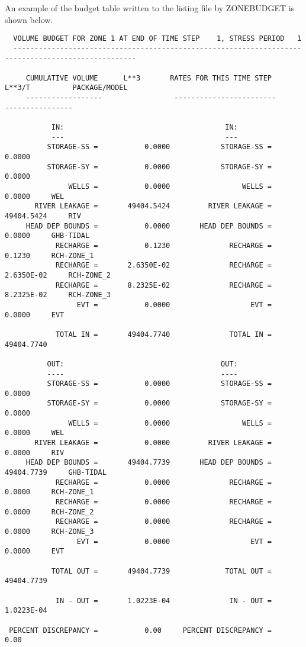 \documentclass[11pt,twoside,twocolumn]{usgsreport}
\begin{document}
An example of the budget table written to the listing file by ZONEBUDGET is shown below.

\begingroup
    \fontsize{8pt}{10pt}\selectfont
    \begin{verbatim}  
  VOLUME BUDGET FOR ZONE 1 AT END OF TIME STEP    1, STRESS PERIOD   1
  ---------------------------------------------------------------------------------------------------

     CUMULATIVE VOLUME      L**3       RATES FOR THIS TIME STEP      L**3/T          PACKAGE/MODEL   
     ------------------                 ------------------------                     ----------------

           IN:                                      IN:
           ---                                      ---
          STORAGE-SS =           0.0000            STORAGE-SS =           0.0000                     
          STORAGE-SY =           0.0000            STORAGE-SY =           0.0000                     
               WELLS =           0.0000                 WELLS =           0.0000     WEL             
       RIVER LEAKAGE =       49404.5424         RIVER LEAKAGE =       49404.5424     RIV             
     HEAD DEP BOUNDS =           0.0000       HEAD DEP BOUNDS =           0.0000     GHB-TIDAL       
            RECHARGE =           0.1230              RECHARGE =           0.1230     RCH-ZONE_1      
            RECHARGE =       2.6350E-02              RECHARGE =       2.6350E-02     RCH-ZONE_2      
            RECHARGE =       8.2325E-02              RECHARGE =       8.2325E-02     RCH-ZONE_3      
                 EVT =           0.0000                   EVT =           0.0000     EVT             

            TOTAL IN =       49404.7740              TOTAL IN =       49404.7740

          OUT:                                     OUT:
          ----                                     ----
          STORAGE-SS =           0.0000            STORAGE-SS =           0.0000                     
          STORAGE-SY =           0.0000            STORAGE-SY =           0.0000                     
               WELLS =           0.0000                 WELLS =           0.0000     WEL             
       RIVER LEAKAGE =           0.0000         RIVER LEAKAGE =           0.0000     RIV             
     HEAD DEP BOUNDS =       49404.7739       HEAD DEP BOUNDS =       49404.7739     GHB-TIDAL       
            RECHARGE =           0.0000              RECHARGE =           0.0000     RCH-ZONE_1      
            RECHARGE =           0.0000              RECHARGE =           0.0000     RCH-ZONE_2      
            RECHARGE =           0.0000              RECHARGE =           0.0000     RCH-ZONE_3      
                 EVT =           0.0000                   EVT =           0.0000     EVT             

           TOTAL OUT =       49404.7739             TOTAL OUT =       49404.7739

            IN - OUT =       1.0223E-04              IN - OUT =       1.0223E-04

 PERCENT DISCREPANCY =           0.00     PERCENT DISCREPANCY =           0.00
    \end{verbatim}  
\endgroup
\end{document}
